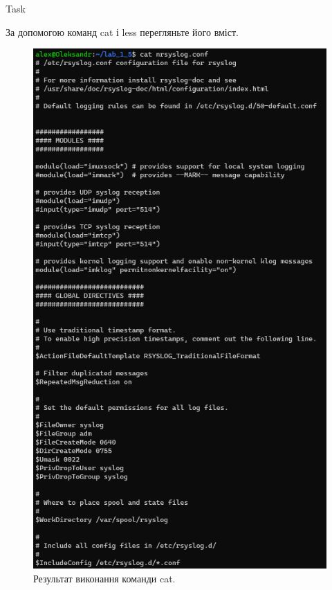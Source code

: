\documentclass[a4paper,12pt]{article}
\newcommand{\RomanNumeralCaps}[1]{\MakeUppercase{\romannumeral #1}}
\begin{document}
    \begin{center}
        \Large{Task \RomanNumeralCaps{16}}
    \end{center}
    За допомогою команд cat і less перегляньте його вміст.
    \begin{figure}[h!]
        \begin{minipage}[h]{1\linewidth}
            \centering
            \includegraphics[width=0.6\linewidth]{Prt sc/Figure_16.png}  
        \end{minipage}
        \caption{Результат виконання команди cat.}
    \end{figure}
\end{document}

